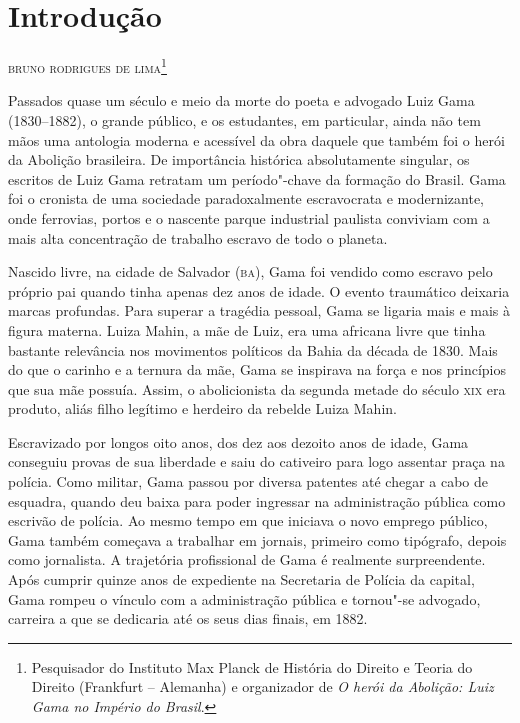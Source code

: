 \chapter{Introdução}

\begin{flushright}
\textsc{bruno rodrigues de lima}\footnote[*]{Pesquisador do Instituto Max Planck de História do Direito e Teoria do
Direito (Frankfurt -- Alemanha) e organizador de \emph{O herói da Abolição:
Luiz Gama no Império do Brasil}.}
\end{flushright}
\bigskip


Passados quase um século e meio da morte do poeta e advogado Luiz Gama
(1830--1882), o grande público, e os estudantes, em particular, ainda não
tem mãos uma antologia moderna e acessível da obra daquele que também
foi o herói da Abolição brasileira. De importância histórica
absolutamente singular, os escritos de Luiz Gama retratam um
período"-chave da formação do Brasil. Gama foi o cronista de uma
sociedade paradoxalmente escravocrata e modernizante, onde ferrovias,
portos e o nascente parque industrial paulista conviviam com a mais
alta concentração de trabalho escravo de todo o planeta.

Nascido livre, na cidade de Salvador (\textsc{ba}), Gama foi vendido como escravo
pelo próprio pai quando tinha apenas dez anos de idade. O evento
traumático deixaria marcas profundas. Para superar a tragédia pessoal,
Gama se ligaria mais e mais à figura materna. Luiza Mahin, a mãe de
Luiz, era uma africana livre que tinha bastante relevância nos
movimentos políticos da Bahia da década de 1830. Mais do que o carinho e
a ternura da mãe, Gama se inspirava na força e nos princípios que sua
mãe possuía. Assim, o abolicionista da segunda metade do século \textsc{xix} era
produto, aliás filho legítimo e herdeiro da rebelde Luiza Mahin.

Escravizado por longos oito anos, dos dez aos dezoito anos de idade,
Gama conseguiu provas de sua liberdade e saiu do cativeiro para logo
assentar praça na polícia. Como militar, Gama passou por diversa
patentes até chegar a cabo de esquadra, quando deu baixa para poder
ingressar na administração pública como escrivão de polícia. Ao mesmo
tempo em que iniciava o novo emprego público, Gama também começava a
trabalhar em jornais, primeiro como tipógrafo, depois como jornalista. A
trajetória profissional de Gama é realmente surpreendente. Após cumprir
quinze anos de expediente na Secretaria de Polícia da capital, Gama
rompeu o vínculo com a administração pública e tornou"-se advogado,
carreira a que se dedicaria até os seus dias finais, em 1882.

